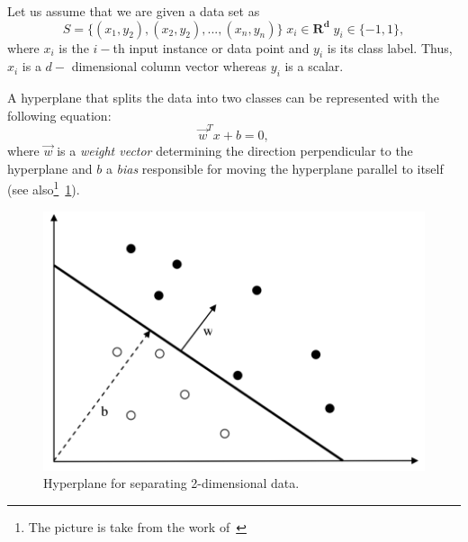 Let us assume that we are given a data set as
\[  S = \{(x_1,y_2), (x_2,y_2), ...,(x_n,y_n) \} \; x_i \in \mathbf{R^d} \; y_i \in \{-1,1\}, \]
where \( x_i\) is the \( i-\)th input instance or data point and \( y_i\) is its class label. Thus, \(x_i\) is a \(d-\) dimensional column vector whereas \( y_i\) is a scalar.

A hyperplane that splits the data into two classes can be represented with the following equation:
\[\vec{w}^Tx + b = 0, \] 
where \(\vec{w}\) is a \textit{weight vector} determining the direction perpendicular to the hyperplane and \(b\) a \textit{bias} responsible for moving the hyperplane parallel to itself (see also\footnote{The picture is take from the work of~\cite{Okun;Valentini:2009}}~\ref{fig:hyperplane1}).

\begin{figure}[h!]
    \centering %
    \includegraphics[scale=0.6]{Graphics/svm1.png}
    \caption{Hyperplane for separating 2-dimensional data.}
    \label{fig:hyperplane1}
\end{figure}

